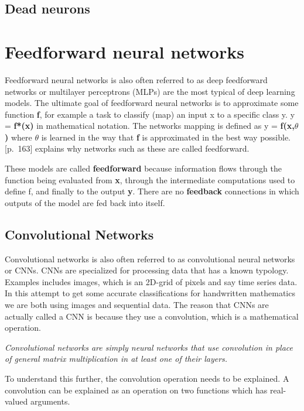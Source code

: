 \subsection{Dead neurons}

\section{Feedforward neural networks}
% 
Feedforward neural networks is also often referred to as deep feedforward networks or multilayer perceptrons (MLPs) are the most typical of deep learning models. The ultimate goal of feedforward neural networks is to approximate some function \textbf{f}, for example a task to classify (map) an input x to a specific class y. y = \textbf{f*(x)} in mathematical notation. The networks mapping is defined as y = \textbf{f(x,$\theta$)} where $\theta$ is learned in the way that \textbf{f} is approximated in the best way possible. \\ %
\cite{goodfellow_deep_2016}[p.~163] explains why networks such as these are called feedforward.
\begin{displayquote}
These models are called \textbf{feedforward} because information flows through the function being evaluated from \textbf{x}, through the intermediate computations used to define f, and finally to the output \textbf{y}. There are no \textbf{feedback} connections in which outputs of the model are fed back into itself.
\end{displayquote}



\subsection{Convolutional Networks}
% 
Convolutional networks is also often referred to as convolutional neural networks or CNNs. CNNs are specialized for processing data that has a known typology. Examples includes images, which is an 2D-grid of pixels and say time series data. In this attempt to get some accurate classifications for handwritten mathematics we are both using images and sequential data. The reason that CNNs are actually called a CNN is because they use a convolution, which is a mathematical operation.
\begin{displayquote}
 \textit{Convolutional networks are simply neural networks that use convolution in place of general matrix multiplication in at least one of their layers.}
\end{displayquote}
To understand this further, the convolution operation needs to be explained. A convolution can be explained as an operation on two functions which has real-valued arguments.\\ 

